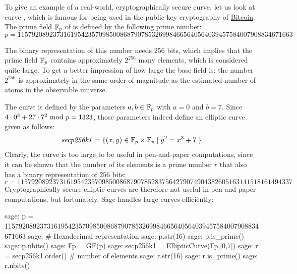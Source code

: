 \begin{example}\label{secp256k1}
To give an example of a real-world, cryptographically secure curve, let us look at curve , which is famous for being used in the public key cryptography of \href{https://bitcoin.org/}{Bitcoin}. The prime field $\mathbb{F}_p$ of  is defined by the following prime number:
$$
p = \scriptstyle 115792089237316195423570985008687907853269984665640564039457584007908834671663
$$
 
 The binary representation of this number needs $256$ bits, which implies that the prime field $\mathbb{F}_p$  contains approximately $2^{256}$ many elements, which is considered quite large. To get a better impression of how large the base field is: the number $2^{256}$ is approximately in the same order of magnitude as the estimated number of atoms in the observable universe. 

The curve  is defined by the parameters $a,b\in \mathbb{F}_p$ with $a=0$ and $b=7$. Since $4\cdot 0^3 + 27\cdot 7^2 \text{ mod } p=1323$, those parameters indeed define an elliptic curve given as follows:
$$
\mathit{secp256k1} = \{(x,y)\in \mathbb{F}_p\times \mathbb{F}_p \;|\; y^2 = x^3 +7\;\} 
$$
Clearly, the  curve is too large to be useful in pen-and-paper computations, since it can be shown that  the number of its elements is a prime number $r$ that also has a binary representation of $256$ bits:
$$
r = \scriptstyle 11579208923731619542357098500868790785283756427907490438260516
3141518161494337
$$
Cryptographically secure elliptic curves are therefore not useful in pen-and-paper computations, but fortunately, Sage handles large curves efficiently:
\begin{sagecommandline}
sage: p = 115792089237316195423570985008687907853269984665640564039457584007908834671663
sage: # Hexadecimal representation
sage: p.str(16)
sage: p.is_prime()
sage: p.nbits()
sage: Fp = GF(p)
sage: secp256k1 = EllipticCurve(Fp,[0,7])
sage: r = secp256k1.order() # number of elements
sage: r.str(16)
sage: r.is_prime()
sage: r.nbits()
\end{sagecommandline}
\end{example}
